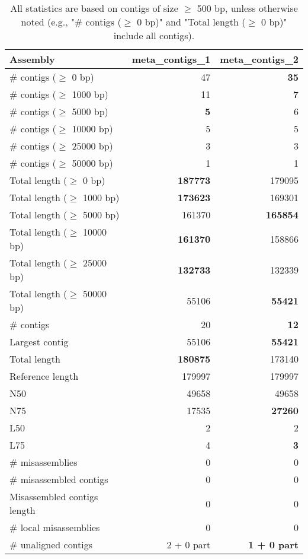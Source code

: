 \documentclass[12pt,a4paper]{article}
\begin{document}
\begin{table}[ht]
\begin{center}
\caption{All statistics are based on contigs of size $\geq$ 500 bp, unless otherwise noted (e.g., "\# contigs ($\geq$ 0 bp)" and "Total length ($\geq$ 0 bp)" include all contigs).}
\begin{tabular}{|l*{2}{|r}|}
\hline
Assembly & meta\_contigs\_1 & meta\_contigs\_2 \\ \hline
\# contigs ($\geq$ 0 bp) & 47 & {\bf 35} \\ \hline
\# contigs ($\geq$ 1000 bp) & 11 & {\bf 7} \\ \hline
\# contigs ($\geq$ 5000 bp) & {\bf 5} & 6 \\ \hline
\# contigs ($\geq$ 10000 bp) & 5 & 5 \\ \hline
\# contigs ($\geq$ 25000 bp) & 3 & 3 \\ \hline
\# contigs ($\geq$ 50000 bp) & 1 & 1 \\ \hline
Total length ($\geq$ 0 bp) & {\bf 187773} & 179095 \\ \hline
Total length ($\geq$ 1000 bp) & {\bf 173623} & 169301 \\ \hline
Total length ($\geq$ 5000 bp) & 161370 & {\bf 165854} \\ \hline
Total length ($\geq$ 10000 bp) & {\bf 161370} & 158866 \\ \hline
Total length ($\geq$ 25000 bp) & {\bf 132733} & 132339 \\ \hline
Total length ($\geq$ 50000 bp) & 55106 & {\bf 55421} \\ \hline
\# contigs & 20 & {\bf 12} \\ \hline
Largest contig & 55106 & {\bf 55421} \\ \hline
Total length & {\bf 180875} & 173140 \\ \hline
Reference length & 179997 & 179997 \\ \hline
N50 & 49658 & 49658 \\ \hline
N75 & 17535 & {\bf 27260} \\ \hline
L50 & 2 & 2 \\ \hline
L75 & 4 & {\bf 3} \\ \hline
\# misassemblies & 0 & 0 \\ \hline
\# misassembled contigs & 0 & 0 \\ \hline
Misassembled contigs length & 0 & 0 \\ \hline
\# local misassemblies & 0 & 0 \\ \hline
\# unaligned contigs & 2 + 0 part & {\bf 1 + 0 part} \\ \hline

\end{tabular}
\end{center}
\end{table}
\end{document}
